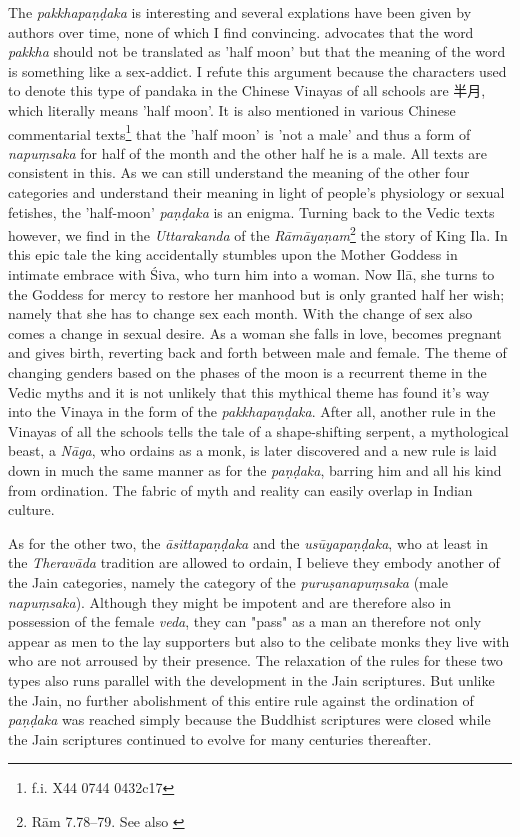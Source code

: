 The {\em pakkhapaṇḍaka} is interesting and several explations have been given by authors over time, none of which I find convincing. \cite{bomhard} advocates that the word {\em pakkha} should not be translated as 'half moon' but that the meaning of the word is something like a sex-addict. I refute this argument because the characters used to denote this type of pandaka in the Chinese Vinayas of all schools are 半月, which literally means 'half moon'. It is also mentioned in various Chinese commentarial texts\footnote{f.i. X44 0744 0432c17} that the 'half moon' is 'not a male' and thus a form of {\em napuṃsaka} for half of the month and the other half he is a male. All texts are consistent in this. As we can still understand the meaning of the other four categories and understand their meaning in light of people's physiology or sexual fetishes, the 'half-moon' {\em paṇḍaka} is an enigma. Turning back to the Vedic texts however, we find in the {\em Uttarakanda} of the {\em Rāmāyaṇam}\footnote{Rām 7.78–79. See also \cite{goldman}} the story of King Ila. In this epic tale the king accidentally stumbles upon the Mother Goddess in intimate embrace with Śiva, who turn him into a woman. Now Ilā, she turns to the Goddess for mercy to restore her manhood but is only granted half her wish; namely that she has to change sex each month. With the change of sex also comes a change in sexual desire. As a woman she falls in love, becomes pregnant and gives birth, reverting back and forth between male and female. The theme of changing genders based on the phases of the moon is a recurrent theme in the Vedic myths and it is not unlikely that this mythical theme has found it's way into the Vinaya in the form of the {\em pakkhapaṇḍaka}. After all, another rule in the Vinayas of all the schools tells the tale of a shape-shifting serpent, a mythological beast, a {\em Nāga}, who ordains as a monk, is later discovered and a new rule is laid down in much the same manner as for the {\em paṇḍaka}, barring him and all his kind from ordination. The fabric of myth and reality can easily overlap in Indian culture.

As for the other two, the {\em āsittapaṇḍaka} and the {\em usūyapaṇḍaka}, who at least in the {\em Theravāda} tradition are allowed to ordain, I believe they embody another of the Jain categories, namely the category of the {\em puruṣanapuṃsaka} (male {\em napuṃsaka}). Although they might be impotent and are therefore also in possession of the female {\em veda}, they can "pass" as a man an therefore not only appear as men to the lay supporters but also to the celibate monks they live with who are not arroused by their presence. The relaxation of the rules for these two types also runs parallel with the development in the Jain scriptures. But unlike the Jain, no further abolishment of this entire rule against the ordination of {\em paṇḍaka} was reached simply because the Buddhist scriptures were closed while the Jain scriptures continued to evolve for many centuries thereafter.

